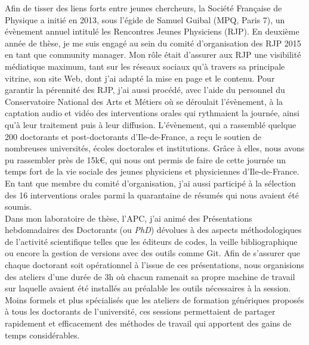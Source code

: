 \documentclass[11pt,onecolumn]{article}
\begin{document}
\indent Afin de tisser des liens forts entre jeunes chercheurs, la Soci\'et\'e Fran\c caise de Physique a initi\'e en 2013, sous l'\'egide de Samuel Guibal (MPQ, Paris 7), un \'ev\`enement annuel intitul\'e les Rencontres Jeunes Physiciens (RJP). En deuxi\`eme ann\'ee de th\`ese, je me suis engag\'e au sein du comit\'e d'organisation des RJP 2015 en tant que community manager. Mon r\^ole \'etait d'assurer aux RJP une visibilit\'e m\'ediatique maximum, tant sur les r\'eseaux sociaux qu'\`a travers sa principale vitrine, son site Web, dont j'ai adapt\'e la mise en page et le contenu. Pour garantir la p\'erennit\'e des RJP, j'ai aussi proc\'ed\'e, avec l'aide du personnel du Conservatoire National des Arts et M\'etiers o\`u se d\'eroulait l'\'ev\`enement, \`a la captation audio et vid\'eo des interventions orales qui rythmaient la journ\'ee, ainsi qu'\`a leur traitement puis \`a leur diffusion. L'\'ev\`enement, qui a rassembl\'e quelque 200 doctorants et post-doctorants d'Ile-de-France, a re\c cu le soutien de nombreuses universit\'es, \'ecoles doctorales et institutions. Gr\^ace \`a elles, nous avons pu rassembler pr\`es de 15k€, qui nous ont permis de faire de cette journ\'ee un temps fort de la vie sociale des jeunes physiciens et physiciennes d'Ile-de-France. En tant que membre du comit\'e d'organisation, j'ai aussi particip\'e \`a la s\'election des 16 interventions orales parmi la quarantaine de r\'esum\'es qui nous avaient \'et\'e soumis.\\

\indent Dans mon laboratoire de th\`ese, l'APC, j'ai anim\'e des Pr\'esentations hebdomadaires des Doctorants (ou \textit{PhD}) d\'evolues \`a des aspects m\'ethodologiques de l'activit\'e scientifique telles que les \'editeurs de codes, la veille bibliographique ou encore la gestion de versions avec des outils comme Git. Afin de s'assurer que chaque doctorant soit op\'erationnel \`a l'issue de ces pr\'esentations, nous organisions des ateliers d'une dur\'ee de 3h o\`u chacun ramenait sa propre machine de travail sur laquelle avaient \'et\'e install\'es au pr\'ealable les outils n\'ecessaires \`a la session. Moins formels et plus sp\'ecialis\'es que les ateliers de formation g\'en\'eriques propos\'es \`a tous les doctorants de l'universit\'e, ces sessions permettaient de partager rapidement et efficacement des m\'ethodes de travail qui apportent des gains de temps consid\'erables.\\
\end{document}
